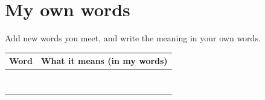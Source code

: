 \documentclass[level=1]{kidscode}
\begin{document}
\clearpage
\section{My own words}
Add new words you meet, and write the meaning in your own words.
\begin{center}\renewcommand{\arraystretch}{2.2}
\begin{tabularx}{\linewidth}{|p{4cm}|X|}
\hline
\textbf{Word} & \textbf{What it means (in my words)}\\ \hline
 & \\ \hline
 & \\ \hline
 & \\ \hline
 & \\ \hline
 & \\ \hline
 & \\ \hline
 & \\ \hline
 & \\ \hline
\end{tabularx}
\end{center}
\end{document}
